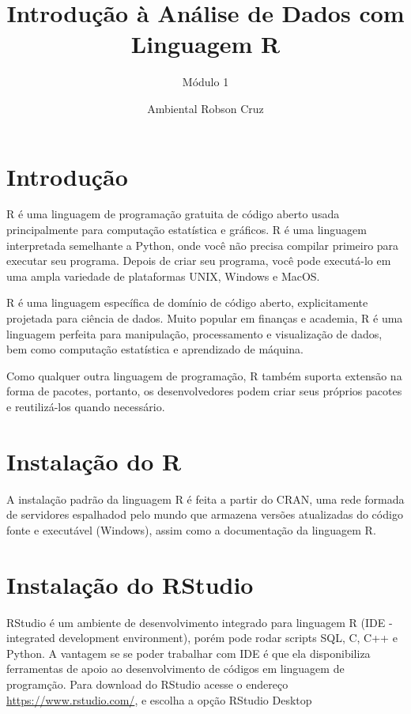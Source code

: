 \documentclass[
]{article}
\title{Introdução à Análise de Dados com Linguagem R}
\subtitle{Módulo 1}
\author{\nAnalista Ambiental Robson Cruz}
\date{}
\begin{document}
\maketitle

{
\setcounter{tocdepth}{2}
\tableofcontents
}
\hypertarget{introduuxe7uxe3o}{%
\section{Introdução}\label{introduuxe7uxe3o}}

R é uma linguagem de programação gratuita de código aberto usada
principalmente para computação estatística e gráficos. R é uma linguagem
interpretada semelhante a Python, onde você não precisa compilar
primeiro para executar seu programa. Depois de criar seu programa, você
pode executá-lo em uma ampla variedade de plataformas UNIX, Windows e
MacOS.

R é uma linguagem específica de domínio de código aberto, explicitamente
projetada para ciência de dados. Muito popular em finanças e academia, R
é uma linguagem perfeita para manipulação, processamento e visualização
de dados, bem como computação estatística e aprendizado de máquina.

Como qualquer outra linguagem de programação, R também suporta extensão
na forma de pacotes, portanto, os desenvolvedores podem criar seus
próprios pacotes e reutilizá-los quando necessário.

\hypertarget{instalauxe7uxe3o-do-r}{%
\section{Instalação do R}\label{instalauxe7uxe3o-do-r}}

A instalação padrão da linguagem R é feita a partir do CRAN, uma rede
formada de servidores espalhadod pelo mundo que armazena versões
atualizadas do código fonte e executável (Windows), assim como a
documentação da linguagem R.

\hypertarget{instalauxe7uxe3o-do-rstudio}{%
\section{Instalação do RStudio}\label{instalauxe7uxe3o-do-rstudio}}

RStudio é um ambiente de desenvolvimento integrado para linguagem R (IDE
- integrated development environment), porém pode rodar scripts SQL, C,
C++ e Python. A vantagem se se poder trabalhar com IDE é que ela
disponibiliza ferramentas de apoio ao desenvolvimento de códigos em
linguagem de programção. Para download do RStudio acesse o endereço
\url{https://www.rstudio.com/}, e escolha a opção RStudio Desktop
\end{document}
